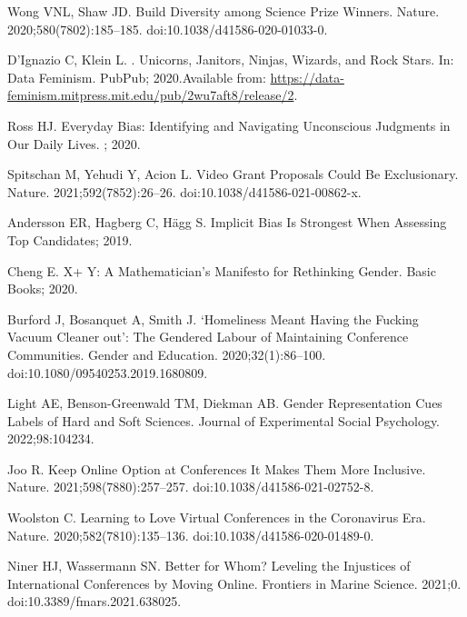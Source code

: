 \documentclass[10pt,letterpaper]{article}
\begin{document}
\begin{thebibliography}{10}
Wong VNL, Shaw JD.
\newblock Build Diversity among Science Prize Winners.
\newblock Nature. 2020;580(7802):185--185.
\newblock doi:{10.1038/d41586-020-01033-0}.

D'Ignazio C, Klein L.
. {{Unicorns}}, {{Janitors}}, {{Ninjas}}, {{Wizards}}, and {{Rock
  Stars}}.
\newblock In: Data {{Feminism}}. {PubPub}; 2020.Available from:
  \url{https://data-feminism.mitpress.mit.edu/pub/2wu7aft8/release/2}.


Ross HJ.
\newblock Everyday {{Bias}}: {{Identifying}} and {{Navigating Unconscious
  Judgments}} in {{Our Daily Lives}}.
; 2020.

Spitschan M, Yehudi Y, Acion L.
\newblock Video Grant Proposals Could Be Exclusionary.
\newblock Nature. 2021;592(7852):26--26.
\newblock doi:{10.1038/d41586-021-00862-x}.

Andersson ER, Hagberg C, H{\"a}gg S. Implicit Bias Is Strongest When Assessing
  Top Candidates; 2019.

Cheng E.
\newblock X+ Y: A Mathematician's Manifesto for Rethinking Gender.
\newblock Basic Books; 2020.

Burford J, Bosanquet A, Smith J.
\newblock `{{Homeliness}} Meant Having the Fucking Vacuum Cleaner out': The
  Gendered Labour of Maintaining Conference Communities.
\newblock Gender and Education. 2020;32(1):86--100.
\newblock doi:{10.1080/09540253.2019.1680809}.

Light AE, {Benson-Greenwald} TM, Diekman AB.
\newblock Gender Representation Cues Labels of Hard and Soft Sciences.
\newblock Journal of Experimental Social Psychology. 2022;98:104234.

Joo R.
\newblock Keep Online Option at Conferences \textemdash{} It Makes Them More
  Inclusive.
\newblock Nature. 2021;598(7880):257--257.
\newblock doi:{10.1038/d41586-021-02752-8}.

Woolston C.
\newblock Learning to Love Virtual Conferences in the Coronavirus Era.
\newblock Nature. 2020;582(7810):135--136.
\newblock doi:{10.1038/d41586-020-01489-0}.

Niner HJ, Wassermann SN.
\newblock Better for {{Whom}}? Leveling the {{Injustices}} of {{International
  Conferences}} by {{Moving Online}}.
\newblock Frontiers in Marine Science. 2021;0.
\newblock doi:{10.3389/fmars.2021.638025}.


\end{thebibliography}
\end{document}
